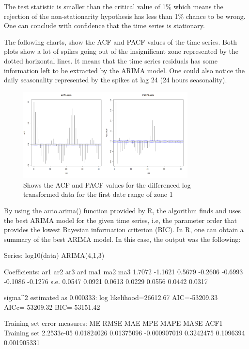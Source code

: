\documentclass{article} %
\begin{document}
The test statistic is smaller than the critical value of 1\% which means the rejection of the non-stationarity hypothesis has less than 1\% chance to be wrong. One can conclude with confidence that the time series is stationary.

The following charts, show the ACF and PACF values of the time series. Both plots show a lot of spikes going out of the insignificant zone represented by the dotted horizontal lines. It means that the time series residuals has some information left to be extracted by the ARIMA model.
One could also notice the daily seasonality represented by the spikes at lag 24 (24 hours seasonality).

\begin{figure}
  \centering
    \includegraphics[width=0.80\textwidth]{ACFandPACFLoadsRaw}
  \caption{Shows the ACF and PACF values for the differenced log transformed data for the first date range of zone 1 }
\end{figure}

By using the auto.arima() function provided by R, the algorithm finds and uses the best ARIMA model for the given time series, i.e, the parameter order that provides the lowest Bayesian information criterion (BIC).
In R, one can obtain a summary of the best ARIMA model. In this case, the output was the following:

Series: log10(data) 
ARIMA(4,1,3)                    

Coefficients:
         ar1      ar2     ar3      ar4      ma1      ma2      ma3
      1.7072  -1.1621  0.5679  -0.2606  -0.6993  -0.1086  -0.1276
s.e.  0.0547   0.0921  0.0613   0.0229   0.0556   0.0442   0.0317

sigma^2 estimated as 0.000333:  log likelihood=26612.67
AIC=-53209.33   AICc=-53209.32   BIC=-53151.42

Training set error measures:
                     ME       RMSE        MAE          MPE      MAPE      MASE        ACF1
Training set 2.2533e-05 0.01824026 0.01375096 -0.000907019 0.3242475 0.1096394 0.001905331
\end{document}
